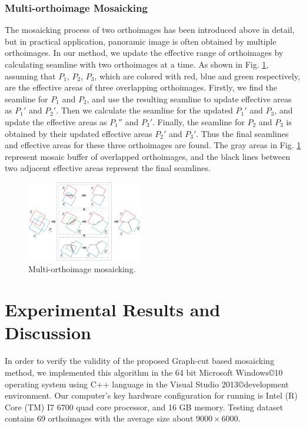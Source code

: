 \documentclass[journal]{IEEEtran}
\begin{document}
\subsubsection{Multi-orthoimage Mosaicking}
The mosaicking process of two orthoimages has been introduced above in detail, but in practical application, panoramic image is often obtained by multiple orthoimages. In our method, we update the effective range of orthoimages by calculating seamline with two orthoimages at a time. As shown in Fig. \ref{fig:multi-orthoimage-mosaic}, assuming that $P_1$, $P_2$, $P_3$, which are colored with red, blue and green respectively, are the effective areas of three overlapping orthoimages. Firstly, we find the seamline for $P_1$ and $P_2$, and use the resulting seamline to update effective areas as ${P_1}'$ and ${P_2}'$. Then we calculate the seamline for the updated ${P_1}'$ and $P_3$, and update the effective areas as ${P_1}''$ and ${P_3}'$. Finally, the seamline for $P_2$ and $P_3$ is obtained by their updated effective areas ${P_2}'$ and ${P_3}'$. Thus the final seamlines and effective areas for these three orthoimages are found. The gray areas in Fig. \ref{fig:multi-orthoimage-mosaic} represent mosaic buffer of overlapped orthoimages, and the black lines between two adjacent effective areas represent the final seamlines.
\begin{figure}[!t]
	\centering
	\includegraphics[width=0.45\textwidth]{mosaicking}
	\caption{Multi-orthoimage mosaicking.}
	\label{fig:multi-orthoimage-mosaic}
\end{figure}

\section{Experimental Results and Discussion}
In order to verify the validity of the proposed Graph-cut based mosaicking method, we implemented this algorithm in the 64 bit Microsoft Windows\copyright 10 operating system using C++ language in the Visual Studio 2013\copyright development environment. Our computer's key hardware configuration for running is Intel (R) Core (TM) I7 6700 quad core processor, and 16 GB memory. Testing dataset contains 69 orthoimages with the average size about $9000\times 6000$.
\end{document}
